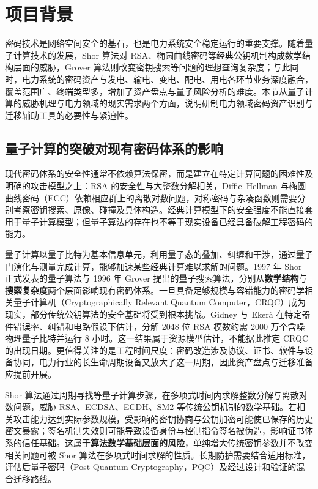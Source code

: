 \section{项目背景}

密码技术是网络空间安全的基石，也是电力系统安全稳定运行的重要支撑。随着量子计算技术的发展，Shor 算法对 RSA、椭圆曲线密码等经典公钥机制构成数学结构层面的威胁，Grover 算法则改变密钥搜索等问题的理想查询复杂度；与此同时，电力系统的密码资产与发电、输电、变电、配电、用电各环节业务深度融合，覆盖范围广、终端类型多，增加了资产盘点与量子风险分析的难度。本节从量子计算的威胁机理与电力领域的现实需求两个方面，说明研制电力领域密码资产识别与迁移辅助工具的必要性与紧迫性。

\subsection{量子计算的突破对现有密码体系的影响}

现代密码体系的安全性通常不依赖算法保密，而是建立在特定计算问题的困难性及明确的攻击模型之上：RSA 的安全性与大整数分解相关，Diffie--Hellman 与椭圆曲线密码（ECC）依赖相应群上的离散对数问题，对称密码与杂凑函数则需要分别考察密钥搜索、原像、碰撞及具体构造。经典计算模型下的安全强度不能直接套用于量子计算模型；但量子算法的存在也不等于现实设备已经具备破解工程密码的能力。

量子计算以量子比特为基本信息单元，利用量子态的叠加、纠缠和干涉，通过量子门演化与测量完成计算，能够加速某些经典计算难以求解的问题。1997 年 Shor 正式发表的量子算法与 1996 年 Grover 提出的量子搜索算法，分别从\textbf{数学结构}与\textbf{搜索复杂度}两个层面影响现有密码体系\cite{shor1997,grover1996}。一旦具备足够规模与容错能力的密码学相关量子计算机（Cryptographically Relevant Quantum Computer，CRQC）成为现实，部分传统公钥算法的安全基础将受到根本挑战。Gidney 与 Eker{\aa} 在特定器件错误率、纠错和电路假设下估计，分解 2048 位 RSA 模数约需 2000 万个含噪物理量子比特并运行 8 小时\cite{gidney2021}。这一结果属于资源模型估计，不能据此推定 CRQC 的出现日期。更值得关注的是工程时间尺度：密码改造涉及协议、证书、软件与设备协同，电力行业的长生命周期设备又放大了这一周期，因此资产盘点与迁移准备应提前开展。

Shor 算法通过周期寻找等量子计算步骤，在多项式时间内求解整数分解与离散对数问题，威胁 RSA、ECDSA、ECDH、SM2 等传统公钥机制的数学基础\cite{shor1997,ec-shor}。若相关攻击能力达到实际参数规模，受影响的密钥协商与公钥加密可能使已保存的历史密文暴露；签名机制失效则可能导致设备身份与控制指令签名被伪造，影响证书体系的信任基础。这属于\textbf{算法数学基础层面的风险}，单纯增大传统密钥参数并不改变相关问题可被 Shor 算法在多项式时间求解的性质。长期防护需要结合适用标准，评估后量子密码（Post-Quantum Cryptography，PQC）及经过设计和验证的混合迁移路线。

